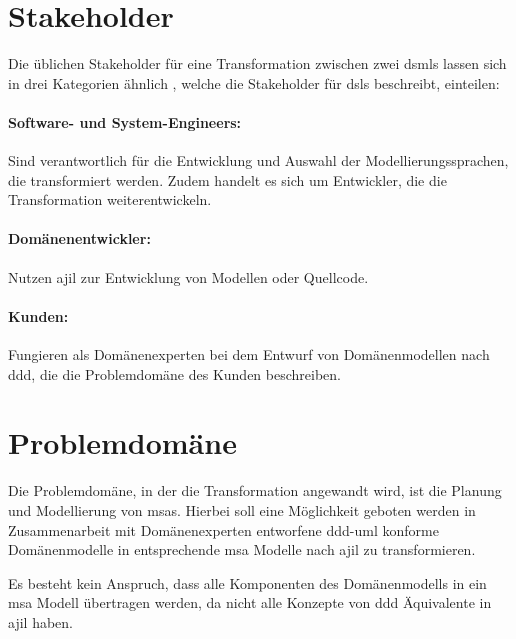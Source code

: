 \documentclass[
	oneside,  %
	ngerman, 
	final, 
	11pt, 
	a4paper, 
	1.1headlines, 
	headinclude=false, 
	footinclude=false, 
	mpinclude=false, 
	pagesize, 
	onecolumn, 
	titlepage, 
	parskip=half, 
	headsepline, 
	chapterprefix=false, 
	version=first, 
	listof=totoc, 
	bibliography=totoc, 
	toc=graduated, 
	fleqn
]{scrbook}
\begin{document}
\section{Stakeholder}
Die üblichen Stakeholder für eine Transformation zwischen zwei \ac{dsml}s lassen sich in drei Kategorien ähnlich \cite{DSMLReq}, welche die Stakeholder für \ac{dsl}s beschreibt, einteilen:
\paragraph{Software- und System-Engineers:} Sind verantwortlich für die Entwicklung und Auswahl der Modellierungssprachen, die transformiert werden. Zudem handelt es sich um Entwickler, die die Transformation weiterentwickeln.
\paragraph{Domänenentwickler:} Nutzen \ac{ajil} zur Entwicklung von Modellen oder Quellcode.
\paragraph{Kunden:} Fungieren als Domänenexperten bei dem Entwurf von Domänenmodellen nach \ac{ddd}, die die Problemdomäne des Kunden beschreiben.
\section{Problemdomäne}
Die Problemdomäne, in der die Transformation angewandt wird, ist die Planung und Modellierung von \ac{msa}s. Hierbei soll eine Möglichkeit geboten werden in Zusammenarbeit mit Domänenexperten entworfene \ac{ddd}-\ac{uml} konforme Domänenmodelle in entsprechende \ac{msa} Modelle nach \ac{ajil} zu transformieren.

Es besteht kein Anspruch, dass alle Komponenten des Domänenmodells in ein \ac{msa} Modell übertragen werden, da nicht alle Konzepte von \ac{ddd} Äquivalente in \ac{ajil} haben.
\end{document}
